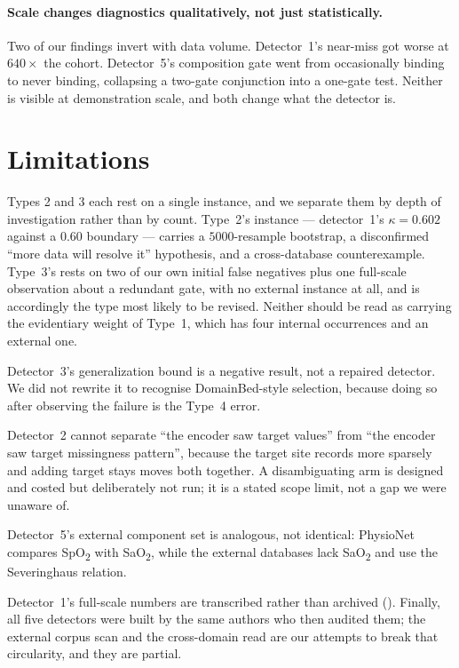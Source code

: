 \documentclass[pmlr,twocolumn,10pt]{jmlr}
\begin{document}
\paragraph{Scale changes diagnostics qualitatively, not just statistically.} Two
of our findings invert with data volume. Detector~1's near-miss got worse at
$640\times$ the cohort. Detector~5's composition gate went from occasionally
binding to never binding, collapsing a two-gate conjunction into a one-gate
test. Neither is visible at demonstration scale, and both change what the
detector is.

\section{Limitations}
\label{sec:limitations}

Types 2 and 3 each rest on a single instance, and we separate them by depth of
investigation rather than by count. Type~2's instance --- detector~1's
$\kappa=0.602$ against a $0.60$ boundary --- carries a $5000$-resample bootstrap,
a disconfirmed ``more data will resolve it'' hypothesis, and a cross-database
counterexample. Type~3's rests on two of our own initial false negatives plus
one full-scale observation about a redundant gate, with no external instance at
all, and is accordingly the type most likely to be revised. Neither should be
read as carrying the evidentiary weight of Type~1, which has four internal
occurrences and an external one.

Detector~3's generalization bound is a negative result, not a repaired detector.
We did not rewrite it to recognise DomainBed-style selection, because doing so
after observing the failure is the Type~4 error.

Detector~2 cannot separate ``the encoder saw target values'' from ``the encoder
saw target missingness pattern'', because the target site records more sparsely
and adding target stays moves both together. A disambiguating arm is designed
and costed but deliberately not run; it is a stated scope limit, not a gap we
were unaware of.

Detector~5's external component set is analogous, not identical: PhysioNet
compares SpO\textsubscript{2} with SaO\textsubscript{2}, while the external
databases lack SaO\textsubscript{2} and use the Severinghaus relation.

Detector~1's full-scale numbers are transcribed rather than archived
(). Finally, all five detectors were built by the same
authors who then audited them; the external corpus scan and the cross-domain
read are our attempts to break that circularity, and they are partial.
\end{document}
